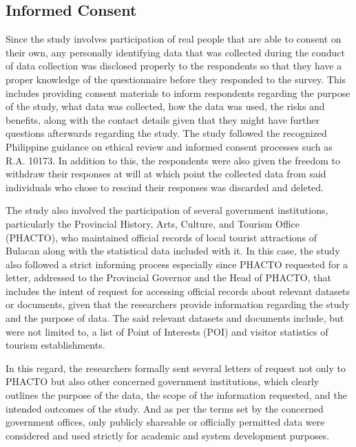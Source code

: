 \subsection{Informed Consent}
Since the study involves participation of real people that are able to consent on their own, any personally identifying data that was collected during the conduct of data collection was disclosed properly to the respondents so that they have a proper knowledge of the questionnaire before they responded to the survey. This includes providing consent materials to inform respondents regarding the purpose of the study, what data was collected, how the data was used, the risks and benefits, along with the contact details given that they might have further questions afterwards regarding the study. The study followed the recognized Philippine guidance on ethical review and informed consent processes such as R.A. 10173. In addition to this, the respondents were also given the freedom to withdraw their responses at will at which point the collected data from said individuals who chose to rescind their responses was discarded and deleted.

The study also involved the participation of several government institutions, particularly the Provincial History, Arts, Culture, and Tourism Office (PHACTO), who maintained official records of local tourist attractions of Bulacan along with the statistical data included with it. In this case, the study also followed a strict informing process especially since PHACTO requested for a letter, addressed to the Provincial Governor and the Head of PHACTO, that includes the intent of request for accessing official records about relevant datasets or documents, given that the researchers provide information regarding the study and the purpose of data. The said relevant datasets and documents include, but were not limited to, a list of Point of Interests (POI) and visitor statistics of tourism establishments.

In this regard, the researchers formally sent several letters of request not only to PHACTO but also other concerned government institutions, which clearly outlines the purpose of the data, the scope of the information requested, and the intended outcomes of the study. And as per the terms set by the concerned government offices, only publicly shareable or officially permitted data were considered and used strictly for academic and system development purposes.

